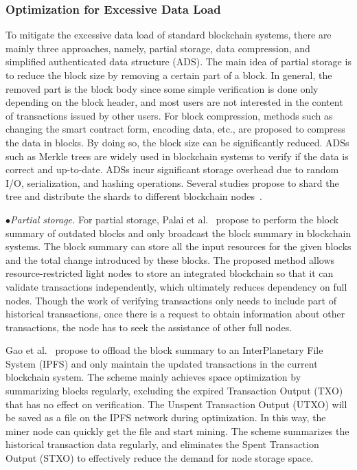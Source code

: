 \documentclass[acmsmall]{acmart}
\begin{document}
\subsubsection{Optimization for Excessive Data Load}


To mitigate the excessive data load of standard blockchain systems, there are mainly three approaches, namely, partial storage, data compression, and simplified authenticated data structure (ADS). The main idea of partial storage is to reduce the block size by removing a certain part of a block. In general, the removed part is the block body since some simple verification is done only depending on the block header, and most users are not interested in the content of transactions issued by other users. For block compression, methods such as changing the smart contract form, encoding data, etc., are proposed to compress the data in blocks. By doing so, the block size can be significantly reduced. ADSs such as Merkle trees are widely used in blockchain systems to verify if the data is correct and up-to-date. ADSs incur significant storage overhead due to random I/O, serialization, and hashing operations. Several studies propose to shard the tree and distribute the shards to  different blockchain nodes~\cite{ponnapalli2019scalable}.



$\bullet${\it Partial storage.}
For partial storage, Palai et al.~\cite{palai2018empowering} propose to perform the block summary of outdated blocks and only broadcast the block summary in blockchain systems. The block summary can store all the input resources for the given blocks and the total change introduced by these blocks. The proposed method allows resource-restricted light nodes to store an integrated blockchain so that it can validate transactions independently, which ultimately reduces dependency on full nodes.
Though the work of verifying transactions only needs to include part of historical transactions, once there is a request to obtain information about other transactions, the node has to seek the assistance of other full nodes.


Gao et al.~\cite{gao2018blockchain} propose to offload the block summary to an InterPlanetary File System (IPFS) and only maintain the updated transactions in the current blockchain system. The scheme mainly achieves space optimization by summarizing blocks regularly, excluding the expired Transaction Output (TXO) that has no effect on verification. The Unspent Transaction Output (UTXO) will be saved as a file on the IPFS network during optimization. In this way, the miner node can quickly get the file and start mining. The scheme summarizes the historical transaction data regularly, and eliminates the Spent Transaction Output (STXO) to effectively reduce the demand for node storage space.
\end{document}
